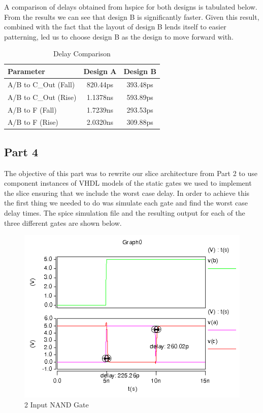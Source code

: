 \documentclass{article}
\begin{document}
A comparison of delays obtained from hspice for both designs is tabulated
below. From the results we can see that design B is significantly faster. Given
this result, combined with the fact that the layout of design B lends itself to
easier patterning, led us to choose design B as the design to move forward with.

\vspace{0.25in}
\begin{table}[H]
    \centering
    \begin{tabular}{lcc}
        \toprule
        \textbf{Parameter} & \textbf{Design A} & \textbf{Design B} \\
        \midrule
        A/B to C\_Out (Fall) & 820.44ps & 393.48ps \\
        A/B to C\_Out (Rise) & 1.1378ns & 593.89ps \\
        A/B to F (Fall)     & 1.7239ns & 293.53ps \\
        A/B to F (Rise)     & 2.0320ns & 309.88ps \\
        \bottomrule
    \end{tabular}
    \caption{Delay Comparison}
\end{table}

\newpage
\subsection*{Part 4}

The objective of this part was to rewrite our slice architecture from Part 2 to
use component instances of VHDL models of the static gates we used to implement
the slice ensuring that we include the worst case delay. In order to achieve this
the first thing we needed to do was simulate each gate and find the worst case delay
times. The spice simulation file and the resulting output for each of the three different
gates are shown below.

\begin{figure}[H]
    \centering
    \includegraphics[width=0.75\linewidth]{../part_4/hspice/nand2_inv.png}
    \caption{2 Input NAND Gate}
\end{figure}
\end{document}
